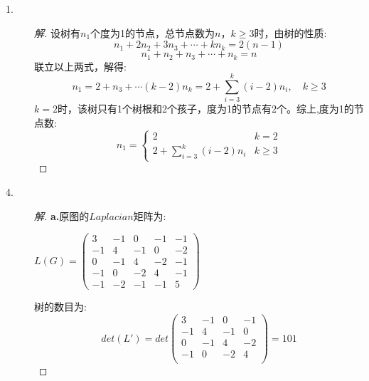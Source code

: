 \documentclass[UTF8, onecolumn, a4paper]{article}
\begin{document}
\begin{description}
\item[1.]
\begin{proof}[解]
设树有$n_1$个度为1的节点，总节点数为$n$，$k\geq3$时，由树的性质:
$$n_1 + 2n_2 + 3n_3 + \cdots + kn_k = 2(n-1)$$
$$n_1+n_2+n_3+\cdots+n_k = n$$
联立以上两式，解得:
$$n_1 = 2 + n_3 + \cdots (k-2)n_k = 2 + \sum_{i=3}^{k}(i-2)n_i,\quad k \geq 3$$
$k=2$时，该树只有1个树根和2个孩子，度为1的节点有$2$个。综上,度为1的节点数:
\begin{equation}
n_1=
\begin{cases}
2&k = 2\\
2 + \sum_{i=3}^{k}(i-2)n_i&k\geq3
\end{cases}
\end{equation}
\end{proof}

\item[4.]
\begin{proof}[解]
\textbf{a.}原图的$Laplacian$矩阵为:
\begin{center}
	$L(G) = \begin{pmatrix}
	3 & -1 & 0 & -1 & -1\\
	-1 & 4 & -1 & 0 & -2\\
	0 & -1 & 4 & -2 & -1 \\
	-1 & 0 & -2 & 4 & -1 \\
	-1 & -2 & -1 & -1 & 5
	\end{pmatrix}$
\end{center}
树的数目为:
$$det(L') = det\left(
\begin{array}{cccc}
3 & -1 & 0 & -1\\
-1 & 4 & -1 & 0\\
0 & -1 & 4 & -2 \\
-1 & 0 & -2 & 4 \\
\end{array}
\right) = 101$$


\end{proof}
\end{description}
\end{document}
